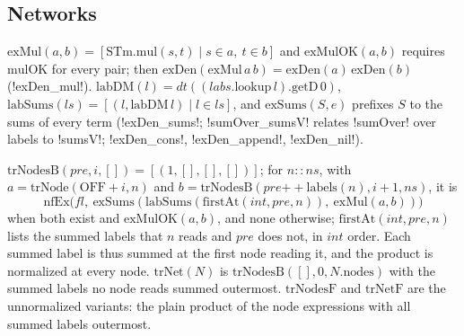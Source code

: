\subsection{Networks}

$\mathrm{exMul}(a,b)=[\mathrm{STm.mul}(s,t)\mid s\in a,\ t\in b]$ and $\mathrm{exMulOK}(a,b)$ requires $\mathrm{mulOK}$ for every pair; then $\mathrm{exDen}(\mathrm{exMul}\,a\,b)=\mathrm{exDen}(a)\,\mathrm{exDen}(b)$ (\lean!exDen_mul!). $\mathrm{labDM}(l)=\mathit{dt}((\mathit{labs}.\mathrm{lookup}\,l).\mathrm{getD}\,0)$, $\mathrm{labSums}(ls)=[(l,\mathrm{labDM}\,l)\mid l\in ls]$, and $\mathrm{exSums}(S,e)$ prefixes $S$ to the sums of every term (\lean!exDen_sums!; \lean!sumOver_sumsV! relates \lean!sumOver! over labels to \lean!sumsV!; \lean!exDen_cons!, \lean!exDen_append!, \lean!exDen_nil!).

\begin{definition}
$\mathrm{trNodesB}(\mathit{pre},i,[])=[(1,[],[],[])]$; for $n\mathbin{::}ns$, with $a=\mathrm{trNode}(\mathrm{OFF}+i,n)$ and $b=\mathrm{trNodesB}(\mathit{pre}\mathbin{+\!\!+}\text{labels}(n),i+1,ns)$, it is
\[
\mathrm{nfEx}\bigl(\mathit{fl},\ \mathrm{exSums}(\mathrm{labSums}(\mathrm{firstAt}(\mathit{int},\mathit{pre},n)),\ \mathrm{exMul}(a,b))\bigr)
\]
when both exist and $\mathrm{exMulOK}(a,b)$, and $\mathrm{none}$ otherwise; $\mathrm{firstAt}(\mathit{int},\mathit{pre},n)$ lists the summed labels that $n$ reads and $\mathit{pre}$ does not, in $\mathit{int}$ order. Each summed label is thus summed at the first node reading it, and the product is normalized at every node. $\mathrm{trNet}(N)$ is $\mathrm{trNodesB}([],0,N.\mathrm{nodes})$ with the summed labels no node reads summed outermost. $\mathrm{trNodesF}$ and $\mathrm{trNetF}$ are the unnormalized variants: the plain product of the node expressions with all summed labels outermost.
\end{definition}


